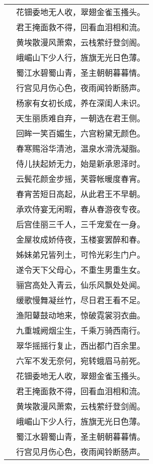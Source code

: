 \begin{longtable}{ll}
    & 花钿委地无人收，翠翅金雀玉搔头。 \\
    & 君王掩面救不得，回看血泪相和流。 \\
    & 黄埃散漫风萧索，云栈萦纡登剑阁。 \\
    & 峨嵋山下少人行，旌旗无光日色薄。 \\
    & 蜀江水碧蜀山青，圣主朝朝暮暮情。 \\
    & 行宫见月伤心色，夜雨闻铃断肠声。 \\
    & 杨家有女初长成，养在深闺人未识。 \\
    & 天生丽质难自弃，一朝选在君王侧。 \\
    & 回眸一笑百媚生，六宫粉黛无颜色。 \\
    & 春寒赐浴华清池，温泉水滑洗凝脂。 \\
    & 侍儿扶起娇无力，始是新承恩泽时。 \\
    & 云鬓花颜金步摇，芙蓉帐暖度春宵。 \\
    & 春宵苦短日高起，从此君王不早朝。 \\
    & 承欢侍宴无闲暇，春从春游夜专夜。 \\
    & 后宫佳丽三千人，三千宠爱在一身。 \\
    & 金屋妆成娇侍夜，玉楼宴罢醉和春。 \\
    & 姊妹弟兄皆列土，可怜光彩生门户。 \\
    & 遂令天下父母心，不重生男重生女。 \\
    & 骊宫高处入青云，仙乐风飘处处闻。 \\
    & 缓歌慢舞凝丝竹，尽日君王看不足。 \\
    & 渔阳鼙鼓动地来，惊破霓裳羽衣曲。 \\
    & 九重城阙烟尘生，千乘万骑西南行。 \\
    & 翠华摇摇行复止，西出都门百余里。 \\
    & 六军不发无奈何，宛转蛾眉马前死。 \\
    & 花钿委地无人收，翠翅金雀玉搔头。 \\
    & 君王掩面救不得，回看血泪相和流。 \\
    & 黄埃散漫风萧索，云栈萦纡登剑阁。 \\
    & 峨嵋山下少人行，旌旗无光日色薄。 \\
    & 蜀江水碧蜀山青，圣主朝朝暮暮情。 \\
    & 行宫见月伤心色，夜雨闻铃断肠声。 \\
\end{longtable}